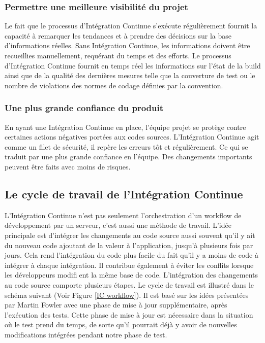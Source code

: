      \subsubsection{Permettre une meilleure visibilité du projet}
      Le fait que le processus d’Intégration Continue s’exécute régulièrement fournit la capacité à remarquer les tendances et à prendre des décisions sur la base d’informations réelles. Sans Intégration Continue, les informations doivent être recueillies manuellement, requérant du temps et des efforts. Le processus d’Intégration Continue fournit en temps réel les informations sur l'état de la build ainsi que de la qualité des dernières mesures telle que la couverture de test ou le nombre de violations des normes de codage définies par la convention.

      \subsubsection{Une plus grande confiance du produit}
      En ayant une Intégration Continue en place, l'équipe projet se protège contre certaines actions négatives portées aux codes sources. L’Intégration Continue agit comme un filet de sécurité, il repère les erreurs tôt et régulièrement. Ce qui se traduit par une plus grande confiance en l'équipe. Des changements importants peuvent être faits avec moins de risques.

    \subsection{Le cycle de travail de l’Intégration Continue}
    L'Intégration Continue n'est pas seulement l'orchestration d'un workflow de développement par un serveur, c'est aussi une méthode de travail. L'idée principale est d'intégrer les changements au code source aussi souvent qu’il y ait du nouveau code ajoutant de la valeur à l’application, jusqu'à plusieurs fois par jours. Cela rend l'intégration du code plus facile du fait qu'il y a moins de code à intégrer à chaque intégration. Il contribue également à éviter les conflits lorsque les développeurs modifient la même base de code. L'intégration des changements au code source comporte plusieurs étapes. Le cycle de travail est illustré dans le schéma suivant (Voir Figure \ref{IC workflow}). Il est basé sur les idées présentées par Martin Fowler \cite{Fow00} avec une phase de mise à jour supplémentaire, après l'exécution des tests. Cette phase de mise à jour est nécessaire dans la situation où le test prend du temps, de sorte qu'il pourrait déjà y avoir de nouvelles modifications intégrées pendant notre phase de test.\\

